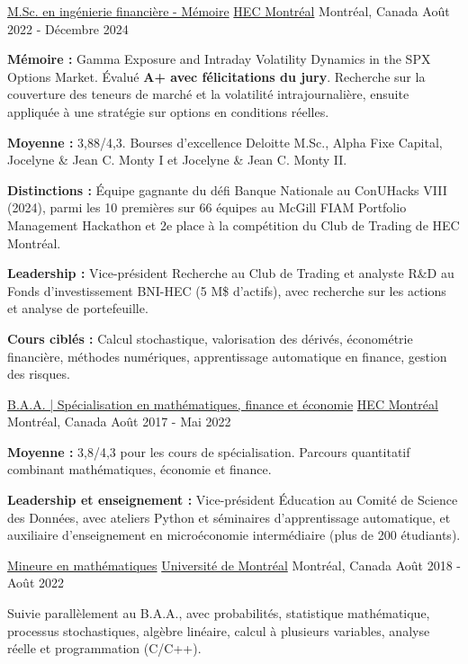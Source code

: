 \begin{cventries}
  \cventry
    {\href{https://www.hec.ca/programmes/maitrises/maitrise-ingenierie-financiere}{M.Sc. en ingénierie financière - Mémoire}}
    {\href{https://www.hec.ca/}{HEC Montréal}}
    {Montréal, Canada}
    {Août 2022 - Décembre 2024}
    {
      \begin{cvitems}
        \item{\textbf{Mémoire :} Gamma Exposure and Intraday Volatility Dynamics in the SPX Options Market. Évalué \textbf{A+ avec félicitations du jury}. Recherche sur la couverture des teneurs de marché et la volatilité intrajournalière, ensuite appliquée à une stratégie sur options en conditions réelles.}
        \item{\textbf{Moyenne :} 3,88/4,3. Bourses d'excellence Deloitte M.Sc., Alpha Fixe Capital, Jocelyne \& Jean C. Monty I et Jocelyne \& Jean C. Monty II.}
        \item{\textbf{Distinctions :} Équipe gagnante du défi Banque Nationale au ConUHacks VIII (2024), parmi les 10 premières sur 66 équipes au McGill FIAM Portfolio Management Hackathon et 2e place à la compétition du Club de Trading de HEC Montréal.}
        \item{\textbf{Leadership :} Vice-président Recherche au Club de Trading et analyste R\&D au Fonds d'investissement BNI-HEC (5 M\$ d'actifs), avec recherche sur les actions et analyse de portefeuille.}
        \item{\textbf{Cours ciblés :} Calcul stochastique, valorisation des dérivés, économétrie financière, méthodes numériques, apprentissage automatique en finance, gestion des risques.}
      \end{cvitems}
    }
  \cventry
    {\href{https://www.hec.ca/etudiants/mon-programme/baa/specialisations/economie-appliquee-finance-mathematiques.html}{B.A.A. | Spécialisation en mathématiques, finance et économie}}
    {\href{https://www.hec.ca/}{HEC Montréal}}
    {Montréal, Canada}
    {Août 2017 - Mai 2022}
    {
      \begin{cvitems}
        \item{\textbf{Moyenne :} 3,8/4,3 pour les cours de spécialisation. Parcours quantitatif combinant mathématiques, économie et finance.}
        \item{\textbf{Leadership et enseignement :} Vice-président Éducation au Comité de Science des Données, avec ateliers Python et séminaires d'apprentissage automatique, et auxiliaire d'enseignement en microéconomie intermédiaire (plus de 200 étudiants).}
      \end{cvitems}
    }
  \cventry
    {\href{https://admission.umontreal.ca/programmes/mineure-en-mathematiques/}{Mineure en mathématiques}}
    {\href{https://www.umontreal.ca/}{Université de Montréal}}
    {Montréal, Canada}
    {Août 2018 - Août 2022}
    {
      \begin{cvitems}
        \item{Suivie parallèlement au B.A.A., avec probabilités, statistique mathématique, processus stochastiques, algèbre linéaire, calcul à plusieurs variables, analyse réelle et programmation (C/C++).}
      \end{cvitems}
    }
\end{cventries}

